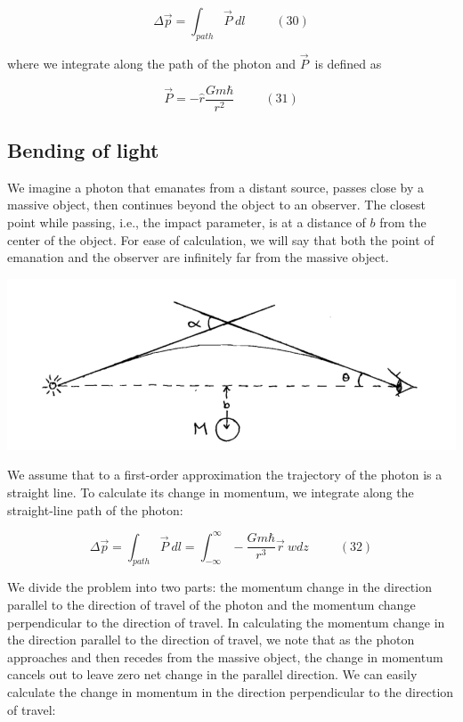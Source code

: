 \documentclass {article}
\begin{document}
$$\Delta \vec p = \int_{path} \vec P ~ dl ~~~~~~~~~~~ (30)$$

where we integrate along the path of the photon and $\vec P$ is defined as

$$\vec P = - \hat r \frac {Gm\hbar}{r^2} ~~~~~~~~~~~ (31)$$

\subsection{Bending of light}

We imagine a photon that emanates from a distant source, passes close by a massive object, then continues beyond the object to an observer. The closest point while passing, i.e., the impact parameter, is at a distance of $b$ from the center of the object. For ease of calculation, we will say that both the point of emanation and the observer are infinitely far from the massive object.

\begin{center}
	\includegraphics[scale=0.4]{light-bending.png}
\end{center}


We assume that to a first-order approximation the trajectory of the photon is a straight line. To calculate its change in momentum, we integrate along the straight-line path of the photon:

$$\Delta \vec p = \int_{path} \vec P ~ dl = \int_{-\infty}^{\infty} - \frac {Gm\hbar}{r^3} \vec r ~ wdz ~~~~~~~~~~~ (32)$$

We divide the problem into two parts: the momentum change in the direction parallel to the direction of travel of the photon and the momentum change perpendicular to the direction of travel. In calculating the momentum change in the direction parallel to the direction of travel, we note that as the photon approaches and then recedes from the massive object, the change in momentum cancels out to leave zero net change in the parallel direction. We can easily calculate the change in momentum in the direction perpendicular to the direction of travel:
\end{document}
